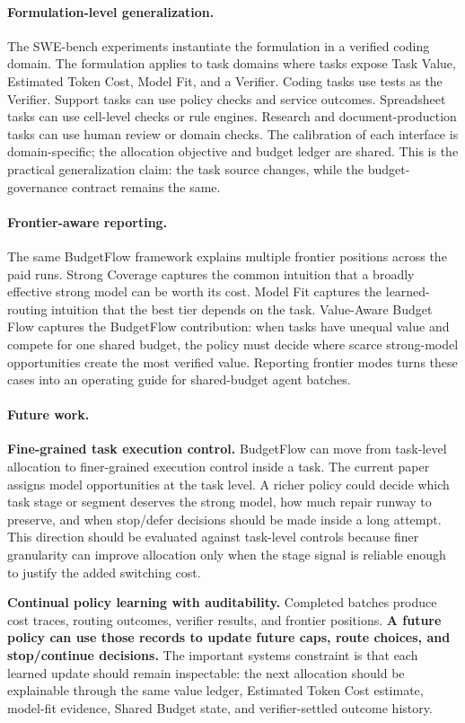 \documentclass{article}
\newcommand{\method}{BudgetFlow\xspace}
\newcommand{\taskvalue}{Task Value\xspace}
\newcommand{\tokencost}{Estimated Token Cost\xspace}
\newcommand{\modelfit}{Model Fit\xspace}
\newcommand{\sharedbudget}{Shared Budget\xspace}
\newcommand{\verifier}{Verifier\xspace}
\begin{document}
\paragraph{Formulation-level generalization.}
The SWE-bench experiments instantiate the formulation in a verified coding domain. The formulation applies to task domains where tasks expose \taskvalue, \tokencost, \modelfit, and a \verifier. Coding tasks use tests as the \verifier. Support tasks can use policy checks and service outcomes. Spreadsheet tasks can use cell-level checks or rule engines. Research and document-production tasks can use human review or domain checks. The calibration of each interface is domain-specific; the allocation objective and budget ledger are shared. This is the practical generalization claim: the task source changes, while the budget-governance contract remains the same.

\paragraph{Frontier-aware reporting.}
The same \method framework explains multiple frontier positions across the paid runs. Strong Coverage captures the common intuition that a broadly effective strong model can be worth its cost. Model Fit captures the learned-routing intuition that the best tier depends on the task. Value-Aware Budget Flow captures the \method contribution: when tasks have unequal value and compete for one shared budget, the policy must decide where scarce strong-model opportunities create the most verified value. Reporting frontier modes turns these cases into an operating guide for shared-budget agent batches.

\paragraph{Future work.}
\textbf{Fine-grained task execution control.} \method can move from task-level allocation to finer-grained execution control inside a task. The current paper assigns model opportunities at the task level. A richer policy could decide which task stage or segment deserves the strong model, how much repair runway to preserve, and when stop/defer decisions should be made inside a long attempt. This direction should be evaluated against task-level controls because finer granularity can improve allocation only when the stage signal is reliable enough to justify the added switching cost.

\textbf{Continual policy learning with auditability.} Completed batches produce cost traces, routing outcomes, verifier results, and frontier positions. \textbf{A future policy can use those records to update future caps, route choices, and stop/continue decisions.} The important systems constraint is that each learned update should remain inspectable: the next allocation should be explainable through the same value ledger, \tokencost estimate, model-fit evidence, \sharedbudget state, and verifier-settled outcome history.
\end{document}
